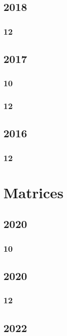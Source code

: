 \documentclass[11pt]{book}
\begin{document}
\section{2018} 
\subsection{12}



\section{2017}
\subsection{10}

\subsection{12}


\section{2016}
\subsection{12}





\chapter{Matrices}
\section{2020}
\subsection{10}

\section{2020}
\subsection{12}

\section{2022}
\end{document}
